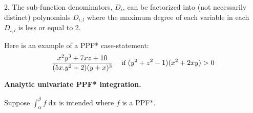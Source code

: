\documentclass[]{article}
\renewcommand{\vec}[1]{\mathbf{#1}}
\newcommand{\singlecase}[2]{#2 \quad \text{ if } #1}
\newcommand{\dd}{\;\mathrm{d}} %
\begin{document}
2. The sub-function denominators, $D_{i}$, can be factorized into (not necessarily distinct) polynomials ${D}_{i,l}$ where the maximum degree of each variable in each $D_{i,l}$ is less or equal to 2.

Here is an example of a PPF* case-statement:
\begin{equation}\vspace{-0.5mm}
{\footnotesize
\label{e:ppf*example}
\singlecase{(y^2+z^2 -1)(x^2+2xy) > 0}
{\frac{x^2 y^3 + 7xz + 10}{(5x.y^2 + 2)(y + x)^3}}
}
\end{equation}



{\bf Analytic univariate PPF* integration.} 

Suppose $\int_{\alpha}^\beta f \dd x$ is intended where $f$ is a PPF*.
\end{document}

